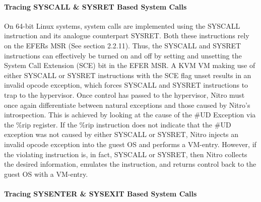 \documentclass{report}
\begin{document}
\begin{spacing}{1.5}
\paragraph{Tracing SYSCALL \& SYSRET Based System Calls}

{\large
\leavevmode\newline
\leavevmode\newline
On 64-bit Linux systems, system calls are implemented using the SYSCALL instruction and its analogue counterpart SYSRET. Both these instructions rely on the EFERs MSR (See section 2.2.11). Thus, the SYSCALL and SYSRET instructions can effectively be turned on and off by setting and unsetting the System Call Extension (SCE) bit in the EFER MSR. A KVM VM making use of either SYSCALL or SYSRET instructions with the SCE flag unset results in an invalid opcode exception, which forces SYSCALL and SYSRET instructions to trap to the hypervisor. Once control has passed to the hypervisor, Nitro must once again differentiate between natural exceptions and those caused by Nitro's introspection. This is achieved by looking at the cause of the \#UD Exception via the \%rip register. If the \%rip instruction does not indicate that the \#UD exception was not caused by either SYSCALL or SYSRET, Nitro injects an invalid opcode exception into the guest OS and performs a VM-entry. However, if the violating instruction is, in fact, SYSCALL or SYSRET, then Nitro collects the desired information, emulates the instruction, and returns control back to the guest OS with a VM-entry.
\leavevmode\newline
}

\paragraph{Tracing SYSENTER \& SYSEXIT Based System Calls}


\end{spacing}
\end{document}
